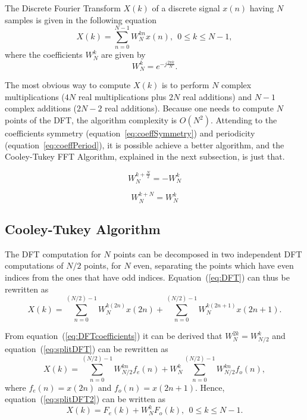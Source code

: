 The Discrete Fourier Transform $X(k)$ of a discrete signal $x(n)$
having $N$ samples is given in the following equation
\begin{equation}
X(k)=\sum_{n=0}^{N-1} W_N^{kn}x(n),\ \ 0\leq k\leq N-1,
\label{eq:DFT}
\end{equation}
where the coefficients $W_N^k$ are given by
\begin{equation}
W_N^k=e^{-j\frac{2\pi k}{N}}.
\label{eq:DFTcoefficients}
\end{equation}

The most obvious way to compute $X(k)$ is to perform $N$ complex
multiplications ($4N$ real multiplications plus $2N$ real additions)
and $N-1$ complex additions ($2N-2$ real additions). Because one needs
to compute $N$ points of the DFT, the algorithm complexity is
$O(N^2)$. Attending to the coefficients symmetry
(equation~\ref{eq:coeffSymmetry}) and periodicity
(equation~\ref{eq:coeffPeriod}), it is possible achieve a better
algorithm, and the Cooley-Tukey FFT Algorithm, explained in the next
subsection, is just that.

\begin{equation}
W_{N}^{k+\frac{N}{2}}=-W_{N}^{k}
\label{eq:coeffSymmetry}
\end{equation}

\begin{equation}
W_{N}^{k+N}=W_{N}^{k}
\label{eq:coeffPeriod}
\end{equation}


\subsection{Cooley-Tukey Algorithm}
\label{subsection:CooleyTukeyAlgorithm}

The DFT computation for $N$ points can be decomposed in two independent
DFT computations of $N/2$ points, for $N$ even, separating the points
which have even indices from the ones that have odd
indices. Equation~(\ref{eq:DFT}) can thus be rewritten as
\begin{equation} 
  X(k) = \sum_{n=0}^{(N/2)-1} W_N^{k(2n)} x(2n) + 
  \sum_{n=0}^{(N/2)-1} W_N^{k(2n+1)} x(2n+1).
  \label{eq:splitDFT}
\end{equation}

From equation~(\ref{eq:DFTcoefficients}) it can be derived that
$W_N^{2k} = W_{N/2}^k$ and equation~(\ref{eq:splitDFT}) can be rewritten as
\begin{equation}
X(k)=\sum_{n=0}^{(N/2)-1} W_{N/2}^{kn} f_e(n) + W_N^k \sum_{n=0}^{(N/2)-1} W_{N/2}^{kn} f_o(n),
\label{eq:splitDFT2}
\end{equation}
where $f_e(n) = x(2n)$ and $f_o(n)= x(2n+1)$. Hence,
equation~(\ref{eq:splitDFT2}) can be written as
\begin{equation} 
X(k)=F_e(k)+W_N^k F_o(k), \ \ 0\leq k\leq N-1.
\label{eq:DFTdecomp}
\end{equation}

